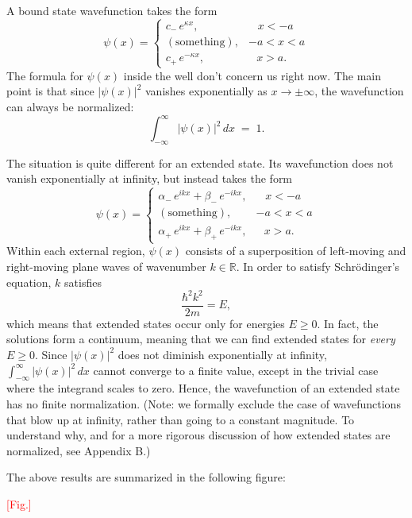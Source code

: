 \documentclass[pra,11pt]{revtex4}
\begin{document}
A bound state wavefunction takes the form
$$\psi(x) = \begin{cases} c_-\, e^{\kappa x}, & \;\;\;x < -a\\ (\mathrm{something}) , & -a < x < a\\ c_+\, e^{-\kappa x} , & \;\;\,x > a.\end{cases}$$
The formula for $\psi(x)$ inside the well don't concern us right now.
The main point is that since $|\psi(x)|^2$ vanishes exponentially as
$x \rightarrow \pm \infty$, the wavefunction can always be
normalized:
$$\int_{-\infty}^\infty |\psi(x)|^2\, dx\; =\; 1.$$

The situation is quite different for an extended state.  Its
wavefunction does not vanish exponentially at infinity, but instead
takes the form
$$\psi(x) = \begin{cases} \alpha_-\, e^{ik x} + \beta_-\, e^{-ik x}, & \;\;\;x < -a\\ (\mathrm{something}) , & -a < x < a\\ \alpha_+\, e^{ik x} + \beta_+\, e^{-ik x} , & \;\;\,x > a.\end{cases}$$
Within each external region, $\psi(x)$ consists of a superposition of
left-moving and right-moving plane waves of wavenumber $k \in
\mathbb{R}$.  In order to satisfy Schr\"odinger's equation, $k$
satisfies
$$\frac{\hbar^2k^2}{2m} = E,$$
which means that extended states occur only for energies $E \ge 0$.
In fact, the solutions form a continuum, meaning that we can find
extended states for \textit{every} $E \ge 0$.  Since $|\psi(x)|^2$
does not diminish exponentially at infinity, $\int_{-\infty}^\infty
|\psi(x)|^2\, dx$ cannot converge to a finite value, except in the
trivial case where the integrand scales to zero.  Hence, the
wavefunction of an extended state has no finite normalization.  (Note:
we formally exclude the case of wavefunctions that blow up at
infinity, rather than going to a constant magnitude.  To understand
why, and for a more rigorous discussion of how extended states are
normalized, see Appendix B.)

The above results are summarized in the following figure:

\textcolor{red}{[Fig.]}

\end{document}
